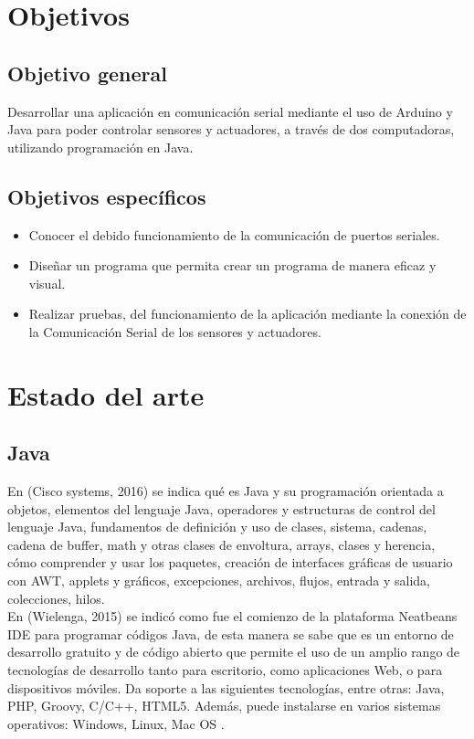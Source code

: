 \documentclass[12pt]{report}
\begin{document}
\section{Objetivos}
\subsection{Objetivo general}
Desarrollar una aplicación en comunicación serial mediante el uso de Arduino y Java para poder controlar sensores y actuadores, a través de dos computadoras, utilizando programación en Java.

\subsection{Objetivos específicos}
\begin{itemize}
\item Conocer el debido funcionamiento de la comunicación de puertos seriales. 
\item Diseñar un programa que permita crear un programa de manera eficaz y visual.
\item Realizar pruebas, del funcionamiento de la aplicación mediante la conexión de la Comunicación Serial de los sensores y actuadores.
\end{itemize}

\section{Estado del arte}
\subsection{Java}
En (Cisco systems, 2016) se indica qué es Java y su programación orientada a objetos, elementos del lenguaje Java, operadores y estructuras de control del lenguaje Java, fundamentos de definición y uso de clases, sistema, cadenas, cadena de buffer, math y otras clases de envoltura, arrays, clases y herencia, cómo comprender y usar los paquetes, creación de interfaces gráficas de usuario con AWT, applets y gráficos, excepciones, archivos, flujos, entrada y salida, colecciones, hilos.\\
En (Wielenga, 2015) se indicó como fue el comienzo de la plataforma Neatbeans IDE para programar códigos Java,  de esta manera se sabe que es un entorno de desarrollo gratuito y de código abierto que permite el uso de un amplio rango de tecnologías de desarrollo tanto para escritorio, como aplicaciones Web, o para dispositivos móviles. Da soporte a las siguientes tecnologías, entre otras: Java, PHP, Groovy, C/C++, HTML5. Además, puede instalarse en varios sistemas operativos: Windows, Linux, Mac OS
.\\
\end{document}
